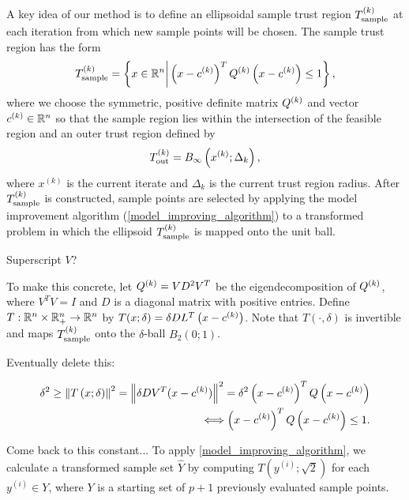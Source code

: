 \documentclass{article}
\begin{document}
A key idea of our method is to define an ellipsoidal sample trust region ${T_{\text{sample}}^{(k)}}$ at each iteration from which new sample points will be chosen.   The sample trust region has the form
\begin{equation}
\label{define_the_sample_region}
{T_{\text{sample}}^{(k)}} = \left\{x \in \mathbb R^n \bigg | \left(x - c^{(k)}\right)^T {Q^{(k)}} \left(x - c^{(k)}\right) \le 1 \right\},
\end{equation}
where we choose the symmetric, positive definite matrix ${Q^{(k)}}$ and vector $c^{(k)} \in \mathbb R^n$ so that
the sample region lies within the intersection of the feasible region and an outer trust region defined by
\begin{equation}
\label{define_outer_trust_region}
{T_{\text{out}}^{(k)}} = B_{\infty}\left(x^{(k)};\Delta_k\right),
\end{equation}
where $x^{(k)}$ is the current iterate and $\Delta_k$ is the current trust region radius.
After  ${T_{\text{sample}}^{(k)}}$ is constructed,  sample points are selected by applying the model improvement algorithm  (\cref{model_improving_algorithm}) 
to a transformed problem in which the ellipsoid ${T_{\text{sample}}^{(k)}}$ is mapped onto the unit ball. 

\color{magenta}
Superscript $V$?
\color{black}

To make this concrete, let ${Q^{(k)}} = V D^2 V^T$ be the eigendecomposition  of ${Q^{(k)}}$, 
where $V^TV = I$ and $D$ is a diagonal matrix with positive entries.  Define
$T:\mathbb R^n \times \mathbb R^n_+ \rightarrow \mathbb R^n$ by $T(x; \delta) = \delta DL^T\left(x - c^{(k)}\right)$.
Note that  $T(\cdot,\delta)$ is invertible and maps ${T_{\text{sample}}^{(k)}}$ onto the $\delta$-ball
$B_2(0;1)$.


\color{magenta}
Eventually delete this:

\begin{align*}
\delta^2 \ge \left\|T\left(x; \delta\right)\right\|^2 = \left\|\delta  DV^T(x - c^{(k)})\right \|^2
=  \delta^2 \left(x - c^{(k)}\right)^TQ\left(x - c^{(k)}\right) \\
\Longleftrightarrow \left(x - c^{(k)}\right)^TQ\left(x - c^{(k)}\right) \le 1.
\end{align*}


\color{black}

\color{magenta}
Come back to this constant...
\color{black}
To apply \cref{model_improving_algorithm}, we calculate a transformed sample set $\hat{Y}$ by computing $T(y^{(i)};\sqrt{2})$ for each $y^{(i)} \in Y$, where $Y$ is a starting set of $p+1$ previously evaluated sample points.    

\end{document}
